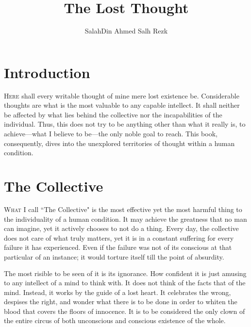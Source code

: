 \documentclass[twoside]{book}
\author{SalahDin Ahmed Salh Rezk}
\title{The Lost Thought}
\begin{document}
\frontmatter
\maketitle
\tableofcontents

\chapter*{Introduction}



\lettrine{H}{ere} shall every writable thought of mine mere lost existence be.
Considerable thoughts are what is the most valuable to any capable intellect. It
shall neither be affected by what lies behind the collective nor the
incapabilities of the individual. Thus, this does not try to be anything other
than what it really is, to achieve—what I believe to be—the only noble goal
to reach. This book, consequently, dives into the unexplored territories of
thought within a human condition.


\mainmatter

\chapter{The Collective}

\lettrine{W}{hat} I call ``The Collective" is the most effective yet the most
harmful thing to the individuality of a human condition. It may achieve the
greatness that no man can imagine, yet it actively chooses to not do a thing.
Every day, the collective does not care of what truly matters, yet it is in a
constant suffering for every failure it has experienced. Even if the failure was
not of its conscious at that particular of an instance; it would torture itself
till the point of absurdity.

The most risible to be seen of it is its ignorance. How confident it is just
amusing to any intellect of a mind to think with. It does not think of the facts
that of the mind. Instead, it works by the guide of a lost heart. It celebrates
the wrong, despises the right, and wonder what there is to be done in order to
whiten the blood that covers the floors of innocence. It is to be considered the
only clown of the entire circus of both unconscious and conscious existence of
the whole.
\end{document}
